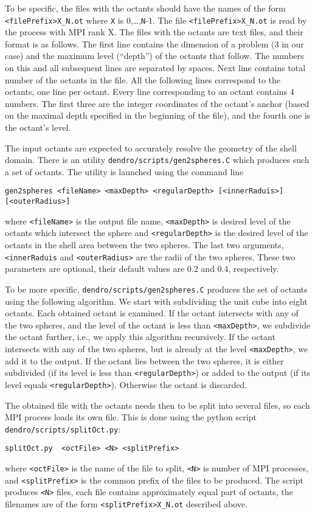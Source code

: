 \documentclass[10pt,reqno,a4paper]{report}
\numberwithin{equation}{section}
\begin{document}
To be specific, the files with the octants should have the names of the form \verb?<filePrefix>X_N.ot? where \verb?X? is 0,\dots,\verb|N|-1. The file \verb?<filePrefix>X_N.ot? is read by the process with MPI rank X. The files with the octants are text files, and their format is as follows. The first line contains the dimension of a problem (3 in our case) and the maximum level (``depth'') of the octants that follow. The numbers on this and all subsequent lines are separated by spaces. Next line contains total number of the octants in the file. All the following lines correspond to the octants, one line per octant. Every line corresponding to an octant contains 4 numbers. The first three are the integer coordinates of the octant's anchor (based on the maximal depth specified in the beginning of the file), and the fourth one is the octant's level.

The input octants are expected to accurately resolve the geometry of the shell domain.
There is an utility \verb'dendro/scripts/gen2spheres.C' which produces such a set of octants. The utility is launched using the command line
\begin{verbatim}
gen2spheres <fileName> <maxDepth> <regularDepth> [<innerRaduis>] 
[<outerRadius>]
\end{verbatim}
where \verb|<fileName>| is the output file name, \verb|<maxDepth>| is desired level of the octants which intersect the sphere and \verb|<regularDepth>| is the desired level of the octants in the shell area between the two spheres. The last two arguments, \verb|<innerRaduis| and \verb|<outerRadius>| are the radii of the two spheres. These two parameters are optional, their default values are 0.2 and 0.4, respectively.

To be more specific, \verb'dendro/scripts/gen2spheres.C' produces the set of octants using the following algorithm. We start with subdividing the unit cube into eight octants. Each obtained octant is
examined. If the octant intersects with any of the two spheres, and the level of the
octant is less than \verb|<maxDepth>|, we subdivide the octant further, i.e., we apply this algorithm recursively. If the octant
intersects with any of the two spheres, but is already at the level \verb|<maxDepth>|, we add it to
the output. If the octant lies between the two spheres, it is either
subdivided (if its level is less than \verb|<regularDepth>|) or added to the output (if its
level equals \verb|<regularDepth>|).  Otherwise the octant is discarded.

The obtained file with the octants needs then to be split into several files, so each MPI process loads its own file. This is done using the python script \verb'dendro/scripts/splitOct.py':
\begin{verbatim}
splitOct.py  <octFile> <N> <splitPrefix>
\end{verbatim}
where \verb|<octFile>| is the name of the file to split, \verb|<N>| is number of MPI processes, and  \verb|<splitPrefix>| is the common prefix of the files to be produced. The script produces \verb|<N>| files, each file contains approximately equal part of octants, the filenames are of the form \verb?<splitPrefix>X_N.ot? described above.
\end{document}
